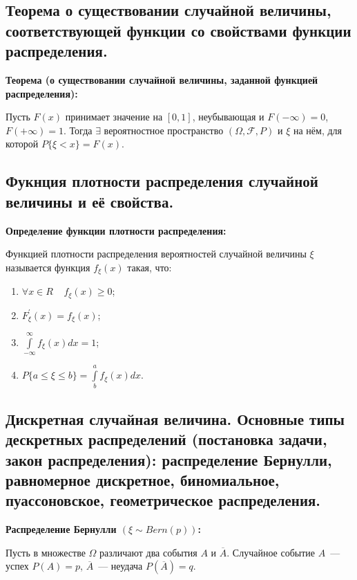 \subsection{Теорема о существовании случайной величины, соответствующей
функции со свойствами функции распределения.}

\textbf{Теорема (о существовании случайной величины, заданной
функцией распределения):}
    \smallskip

    Пусть $F(x)$ принимает значение на $[0, 1]$, неубывающая и $F(-\infty) = 0$,
    $F(+\infty) = 1$. Тогда $\exists$ вероятностное пространство $(\Omega, \mathcal{F},
    P)$ и $\xi$ на нём, для которой $P\{\xi < x\} = F(x)$.

\subsection{Фукнция плотности распределения случайной величины и её свойства.}

\textbf{Определение функции плотности
распределения:}
    \smallskip

    Функцией плотности распределения вероятностей
    случайной величины $\xi$ называется функция
    $f_{\xi}(x)$ такая, что:

    \begin{enumerate}
        \item{$\forall x \in R \;\;\;\; f_{\xi}
        (x) \geq 0$;}
        \item{$F_{\xi}^{'}(x) = f_{\xi}(x)$;}
        \item{$\int\limits_{-\infty}^{\infty} f_{\xi}(x)
        dx = 1$;}
        \item{$P\{a \leq \xi \leq b\} = \int\limits_b^{a}
        f_{\xi}(x) dx$.}
    \end{enumerate}
    \bigskip

\subsection{Дискретная случайная величина. Основные типы дескретных распределений
(постановка задачи, закон распределения): распределение Бернулли, 
равномерное дискретное, биномиальное, пуассоновское, геометрическое распределения.}

\textbf{Распределение Бернулли $(\xi \sim Bern(p))$:}
    \smallskip

    Пусть в множестве $\Omega$ различают два события $A$ и $\overline{A}$.
    Случайное событие $A$~--- успех $P(A) = p$, $\overline{A}$~--- неудача
    $P(\overline{A}) = q$.
    \smallskip
    
